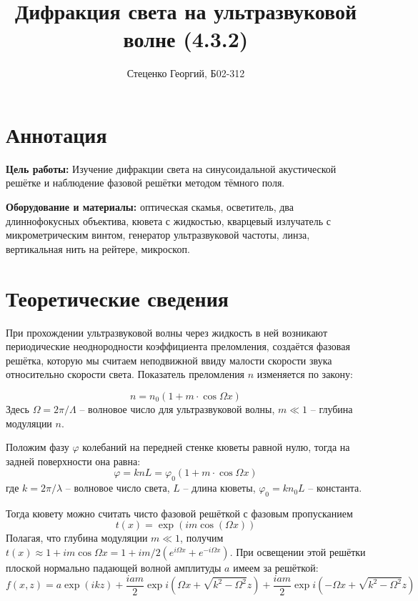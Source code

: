 \documentclass[12pt, a4paper]{article}
\title{Дифракция света на ультразвуковой волне (4.3.2)}
\author{Стеценко Георгий, Б02-312}
\date{}
\begin{document}
\maketitle

\section{Аннотация}
\textbf{Цель работы:} Изучение дифракции света на синусоидальной акустической 
решётке и наблюдение фазовой решётки методом тёмного поля.

\textbf{Оборудование и материалы:} оптическая скамья, осветитель, два длиннофокусных 
объектива, кювета с жидкостью, кварцевый излучатель с микрометрическим винтом, 
генератор ультразвуковой частоты, линза, вертикальная нить на рейтере, микроскоп.

\section{Теоретические сведения}
При прохождении ультразвуковой волны через жидкость в ней возникают периодические неоднородности
коэффициента преломления, создаётся фазовая решётка, которую мы считаем неподвижной ввиду
малости скорости звука относительно скорости света. Показатель преломления $n$ изменяется
по закону:

\begin{equation}
  n = n_0 (1 + m \cdot \cos \Omega x)
\end{equation}
Здесь $\Omega = 2\pi / \Lambda$ -- волновое число для ультразвуковой волны, $m \ll 1$ -- глубина 
модуляции $n$.

Положим фазу $\varphi$ колебаний на передней стенке кюветы равной нулю, тогда на задней 
поверхности она равна:
\begin{equation}
  \varphi = knL = \varphi_0 (1 + m\cdot \cos \Omega x)
\end{equation}
где $k = 2\pi / \lambda$ -- волновое число света, $L$ -- длина кюветы, $\varphi_0 = kn_0 L$ -- константа. 

Тогда кювету можно считать чисто фазовой решёткой с фазовым пропусканием  
$$t(x) = \exp (im \cos (\Omega x))$$
Полагая, что глубина модуляции $m \ll 1$, получим $t(x) \approx 1 + im \cos \Omega x = 1 + im/2 \left( e^{i\Omega x} + e^{-i\Omega x}\right)$.
При освещении этой решётки плоской нормально падающей волной амплитуды $a$ имеем за решёткой:
$$f(x,z) = a \exp (ikz) + \frac{iam}{2} \exp i(\Omega x + \sqrt{k^2 - \Omega^2}z) + \frac{iam}{2} \exp i(-\Omega x + \sqrt{k^2 - \Omega^2}z)$$
\end{document}
